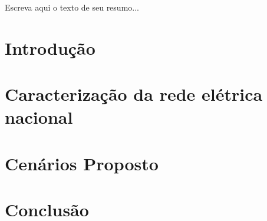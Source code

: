 \documentclass[capchap,sumarioincompleto,a4paper,12pt,ruledheader,normaltoc]{utfprtex}%
\begin{document}
\capa%
\newpage%
\newpage%


\begin{Resumo}
Escreva aqui o texto de seu resumo... 
\utfprTeX
\end{Resumo}

\listadefiguras

\listadetabelas


\listadesimbolos

\sumario

\chapter{Introdução} 


\chapter{Caracterização da rede elétrica nacional} 


\chapter{Cenários Proposto} 


%

%

%

\chapter{Conclusão} 



\end{document}
